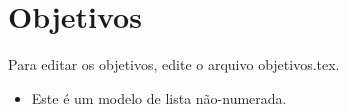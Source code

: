 \chapter{Objetivos}

Para editar os objetivos, edite o arquivo objetivos.tex. 


\begin{itemize}
	\item Este é um modelo de lista não-numerada.
\end{itemize}


